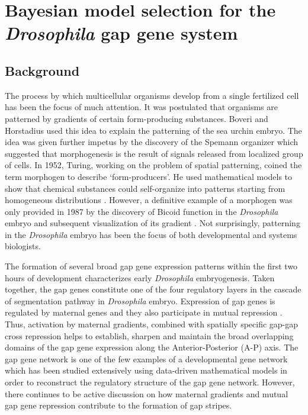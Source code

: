 \chapter{Bayesian model selection for the \textit{Drosophila} gap gene system \cite{zubair2019}}
\label{cha:research_topic_1}

\section{Background}

The process by which multicellular organisms develop from a single fertilized cell has been the focus of much attention. It was postulated that organisms are patterned by gradients of certain form-producing substances. Boveri \cite{boveri1901} and Horstadius \cite{horstadius35} used this idea to explain the patterning of the sea urchin embryo. The idea was given further impetus by the discovery of the Spemann organizer \cite{spemann24} which suggested that morphogenesis is the result of signals released from localized group of cells. In 1952, Turing, working on the problem of spatial patterning, coined the term morphogen to describe `form-producers'. He used mathematical models to show that chemical substances could self-organize into patterns starting from homogeneous distributions \cite{turing52}. However, a definitive example of a morphogen was only provided in 1987 by the discovery of Bicoid function in the \textit{Drosophila} embryo \cite{nusslein80,nusslein87} and subsequent visualization of its gradient \cite{driever88a,driever88b}. Not surprisingly, patterning in the \textit{Drosophila} embryo has been the focus of both developmental and systems biologists. 

The formation of several broad gap gene \cite{jaeger11} expression patterns within the first two hours of development characterizes early \textit{Drosophila} embryogenesis. Taken together, the gap genes constitute one of the four regulatory layers in the cascade of segmentation pathway in \textit{Drosophila} embryo. Expression of gap genes is regulated by maternal genes \cite{hulskamp90} and they also participate in mutual repression \cite{kraut91}. Thus, activation  by maternal gradients, combined with spatially specific gap-gap cross repression helps to establish, sharpen and maintain the broad overlapping domains of the gap gene expression along the Anterior-Posterior (A-P) axis. The gap gene network is one of the few examples of a developmental gene network which has been studied extensively using data-driven mathematical models \cite{jaeger04b,jaeger09,jaeger12} in order to reconstruct the regulatory structure of the gap gene network. However, there continues to be active discussion \cite{papatsenko08,zinzen07} on how maternal gradients and mutual gap gene repression contribute to the formation of gap stripes. 

